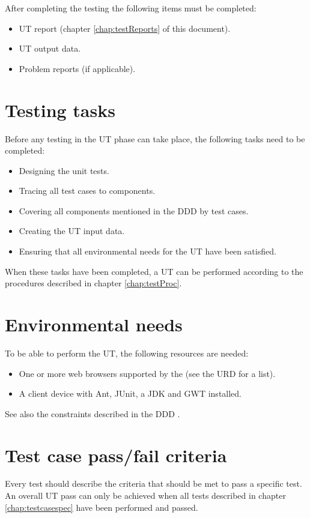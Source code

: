 After completing the testing the following items must be completed:

\begin{itemize}
  \item UT report (chapter \ref{chap:testReports} of this document).
  \item UT output data.
  \item Problem reports (if applicable).
\end{itemize}

\section{Testing tasks}
Before any testing in the UT phase can take place, the following tasks need to be completed:

\begin{itemize}
  \item Designing the unit tests.
  \item Tracing all test cases to components.
  \item Covering all components mentioned in the DDD \cite{DDD} by test cases.
  \item Creating the UT input data.
  \item Ensuring that all environmental needs for the UT have been satisfied.
\end{itemize}

\noindent When these tasks have been completed, a UT can be performed according to the procedures described in chapter \ref{chap:testProc}.

\section{Environmental needs}
To be able to perform the UT, the following resources are needed:

\begin{itemize}
  \item One or more web browsers supported by the \applicationname{} (see the URD \cite{urd} for a list).
  \item A client device with Ant, JUnit, a JDK and GWT installed.
\end{itemize}

\noindent See also the constraints described in the DDD \cite{DDD}.

\section{Test case pass/fail criteria}
Every test should describe the criteria that should be met to pass a specific test. An overall UT pass can only be achieved when all tests described in chapter \ref{chap:testcasespec} have been performed and passed.
